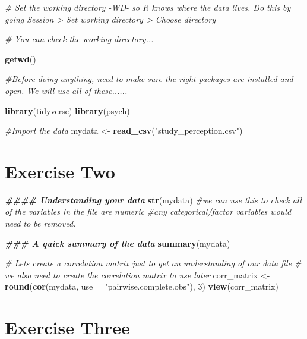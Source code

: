 \documentclass[
]{book}
\newenvironment{Shaded}{\begin{snugshade}}{\end{snugshade}}
\newcommand{\AttributeTok}[1]{\textcolor[rgb]{0.13,0.29,0.53}{#1}}
\newcommand{\CommentTok}[1]{\textcolor[rgb]{0.56,0.35,0.01}{\textit{#1}}}
\newcommand{\DecValTok}[1]{\textcolor[rgb]{0.00,0.00,0.81}{#1}}
\newcommand{\DocumentationTok}[1]{\textcolor[rgb]{0.56,0.35,0.01}{\textbf{\textit{#1}}}}
\newcommand{\FunctionTok}[1]{\textcolor[rgb]{0.13,0.29,0.53}{\textbf{#1}}}
\newcommand{\NormalTok}[1]{#1}
\newcommand{\OtherTok}[1]{\textcolor[rgb]{0.56,0.35,0.01}{#1}}
\newcommand{\StringTok}[1]{\textcolor[rgb]{0.31,0.60,0.02}{#1}}
\let\oldsection\section
\renewcommand{\section}{\needspace{5\baselineskip}\oldsection}
\begin{document}
\begin{Shaded}
\begin{Highlighting}[]
\CommentTok{\# Set the working directory {-}WD{-} so R knows where the data lives. Do this by going Session \textgreater{} Set working directory \textgreater{} Choose directory}

\CommentTok{\# You can check the working directory...}

\FunctionTok{getwd}\NormalTok{()}

\CommentTok{\#Before doing anything, need to make sure the right packages are installed and open. We will use all of these......}

\FunctionTok{library}\NormalTok{(tidyverse)}
\FunctionTok{library}\NormalTok{(psych)}

\CommentTok{\#Import the data}
\NormalTok{mydata }\OtherTok{\textless{}{-}} \FunctionTok{read\_csv}\NormalTok{(}\StringTok{"study\_perception.csv"}\NormalTok{)}
\end{Highlighting}
\end{Shaded}

\section{Exercise Two}\label{exercise-two}

\begin{Shaded}
\begin{Highlighting}[]
\DocumentationTok{\#\#\#\# Understanding your data}
\FunctionTok{str}\NormalTok{(mydata) }\CommentTok{\#we can use this to check all of the variables in the file are numeric}
\CommentTok{\#any categorical/factor variables would need to be removed.}

\DocumentationTok{\#\#\# A quick summary of the data}
\FunctionTok{summary}\NormalTok{(mydata)}

\CommentTok{\# Let\textquotesingle{}s create a correlation matrix just to get an understanding of our data file}
\CommentTok{\# we also need to create the correlation matrix to use later}
\NormalTok{corr\_matrix }\OtherTok{\textless{}{-}} \FunctionTok{round}\NormalTok{(}\FunctionTok{cor}\NormalTok{(mydata, }\AttributeTok{use =} \StringTok{"pairwise.complete.obs"}\NormalTok{), }\DecValTok{3}\NormalTok{)}
\FunctionTok{view}\NormalTok{(corr\_matrix)}
\end{Highlighting}
\end{Shaded}

\section{Exercise Three}\label{exercise-three}
\end{document}
